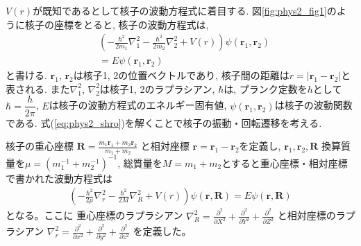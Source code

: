 $V(r)$が既知であるとして核子の波動方程式に着目する. 図\ref{fig:phys2_fig1}のように核子の座標をとると, 核子の波動方程式は, 
\begin{align}
  \label{eq:phys2_shro}
&\left( - \frac{\hbar^2}{2 m_1} \nabla_{1}^2  - \frac{\hbar^2}{2 m_2} \nabla_{2}^2 + V(r) \right) \psi(\boldsymbol{r}_1, \boldsymbol{r}_2) \nonumber \\
&= E \psi(\boldsymbol{r}_1, \boldsymbol{r}_2)
\end{align}
と書ける. $\boldsymbol{r}_1$, $\boldsymbol{r}_2$は核子1, 2の位置ベクトルであり, 核子間の距離は$r = |\boldsymbol{r}_1 - \boldsymbol{r}_2|$と表される. また$\nabla_{1}^2$, $\nabla_{2}^2$は核子1, 2のラプラシアン, $\hbar$は, プランク定数を$h$として$\hbar = \dfrac{h}{2 \pi}$, $E$は核子の波動方程式のエネルギー固有値, $\psi(\boldsymbol{r}_1, \boldsymbol{r}_2)$は核子の波動関数である. 式(\ref{eq:phys2_shro})を解くことで核子の振動・回転遷移を考える. 


核子の重心座標
$  \boldsymbol{R} = \displaystyle{\frac{m_1 \boldsymbol{r}_1 + m_2 \boldsymbol{r}_2}{m_1 + m_2} }$
と相対座標
$\boldsymbol{r} = \boldsymbol{r}_1 - \boldsymbol{r}_2$を定義し, $\boldsymbol{r}_1, \boldsymbol{r}_2, \boldsymbol{R}$  換算質量を$\mu = (m_1^{-1} + m_2^{-1})^{-1}$, 総質量を$M = m_1 + m_2$とすると重心座標・相対座標で書かれた波動方程式は
\begin{align}
\label{eq:com_each}
\left( - \frac{\hbar^2}{2 \mu} \nabla_{r}^2  - \frac{\hbar^2}{2 M} \nabla_{R}^2 + V(r) \right) \psi(\boldsymbol{r},\boldsymbol{R}) = E \psi(\boldsymbol{r},\boldsymbol{R})
\end{align}
となる。ここに
重心座標のラプラシアン
$\nabla^2_{R} = \displaystyle{\frac{\partial^2}{\partial X^2} +  \frac{\partial^2}{\partial Y^2} +  \frac{\partial^2}{\partial Z^2}}$
と相対座標のラプラシアン
$\nabla^2_{r} = \displaystyle{\frac{\partial^2}{\partial x^2} +  \frac{\partial^2}{\partial y^2} +  \frac{\partial^2}{\partial z^2}}$
を定義した。

